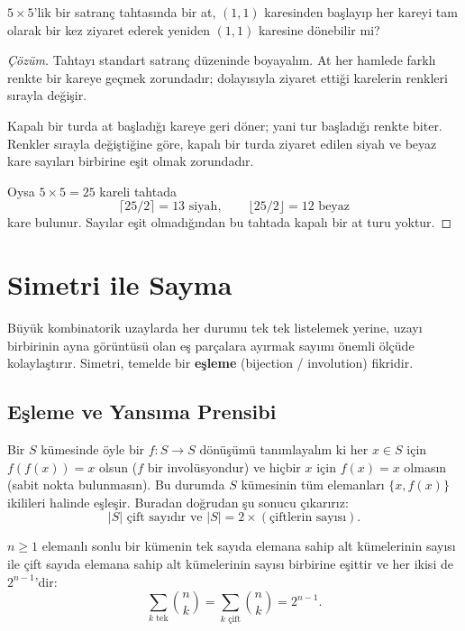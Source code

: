 \begin{example}
$5 \times 5$'lik bir satranç tahtasında bir at, $(1, 1)$ karesinden başlayıp her kareyi tam olarak bir kez ziyaret ederek yeniden $(1, 1)$ karesine dönebilir mi?
\end{example}

\begin{proof}[Çözüm]
Tahtayı standart satranç düzeninde boyayalım. At her hamlede farklı renkte bir kareye geçmek zorundadır; dolayısıyla ziyaret ettiği karelerin renkleri sırayla değişir.

Kapalı bir turda at başladığı kareye geri döner; yani tur başladığı renkte biter. Renkler sırayla değiştiğine göre, kapalı bir turda ziyaret edilen siyah ve beyaz kare sayıları birbirine eşit olmak zorundadır.

Oysa $5 \times 5 = 25$ kareli tahtada
\[
\lceil 25 / 2 \rceil = 13 \text{ siyah}, \qquad \lfloor 25 / 2 \rfloor = 12 \text{ beyaz}
\]
kare bulunur. Sayılar eşit olmadığından bu tahtada kapalı bir at turu yoktur.
\end{proof}

\section{Simetri ile Sayma}

Büyük kombinatorik uzaylarda her durumu tek tek listelemek yerine, uzayı birbirinin ayna görüntüsü olan eş parçalara ayırmak sayımı önemli ölçüde kolaylaştırır. Simetri, temelde bir \textbf{eşleme} (bijection / involution) fikridir.

\subsection{Eşleme ve Yansıma Prensibi}

Bir $S$ kümesinde öyle bir $f: S \to S$ dönüşümü tanımlayalım ki her $x \in S$ için $f(f(x)) = x$ olsun ($f$ bir involüsyondur) ve hiçbir $x$ için $f(x) = x$ olmasın (sabit nokta bulunmasın). Bu durumda $S$ kümesinin tüm elemanları $\{x, f(x)\}$ ikilileri halinde eşleşir. Buradan doğrudan şu sonucu çıkarırız:
\[
|S| \text{ çift sayıdır ve } |S| = 2 \times (\text{çiftlerin sayısı}).
\]

\begin{theorem}
$n \ge 1$ elemanlı sonlu bir kümenin tek sayıda elemana sahip alt kümelerinin sayısı ile çift sayıda elemana sahip alt kümelerinin sayısı birbirine eşittir ve her ikisi de $2^{n-1}$'dir:
\[
\sum_{k \text{ tek}} \binom{n}{k} = \sum_{k \text{ çift}} \binom{n}{k} = 2^{n-1}.
\]
\end{theorem}

